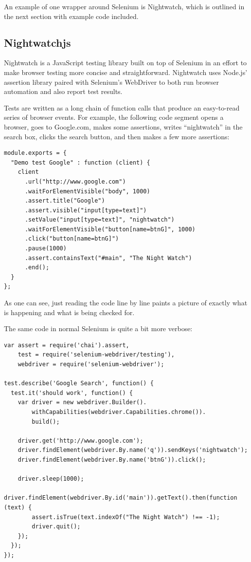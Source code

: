 \documentclass[12pt]{ucthesis}
\begin{document}
An example of one wrapper around Selenium is Nightwatch, which is outlined in the next section with example code included.

\subsection{Nightwatchjs}
Nightwatch \cite{NightwatchJS} is a JavaScript testing library built on top of Selenium in an effort to make browser testing more concise and straightforward. Nightwatch uses Node.js' assertion library paired with Selenium's WebDriver to both run browser automation and also report test results.

Tests are written as a long chain of function calls that produce an easy-to-read series of browser events. For example, the following code segment opens a browser, goes to Google.com, makes some assertions, writes ``nightwatch'' in the search box, clicks the search button, and then makes a few more assertions:
\begin{lstlisting}
module.exports = {
  "Demo test Google" : function (client) {
    client
      .url("http://www.google.com")
      .waitForElementVisible("body", 1000)
      .assert.title("Google")
      .assert.visible("input[type=text]")
      .setValue("input[type=text]", "nightwatch")
      .waitForElementVisible("button[name=btnG]", 1000)
      .click("button[name=btnG]")
      .pause(1000)
      .assert.containsText("#main", "The Night Watch")
      .end();
  }
};
\end{lstlisting}
As one can see, just reading the code line by line paints a picture of exactly what is happening and what is being checked for. 

The same code in normal Selenium is quite a bit more verbose:
\begin{lstlisting}
var assert = require('chai').assert,
    test = require('selenium-webdriver/testing'),
    webdriver = require('selenium-webdriver');

test.describe('Google Search', function() {
  test.it('should work', function() {
    var driver = new webdriver.Builder().
        withCapabilities(webdriver.Capabilities.chrome()).
        build();

    driver.get('http://www.google.com');
    driver.findElement(webdriver.By.name('q')).sendKeys('nightwatch');
    driver.findElement(webdriver.By.name('btnG')).click();

    driver.sleep(1000);
    driver.findElement(webdriver.By.id('main')).getText().then(function (text) {
        assert.isTrue(text.indexOf("The Night Watch") !== -1);
        driver.quit();
    });
  });
});
\end{lstlisting}
\end{document}
